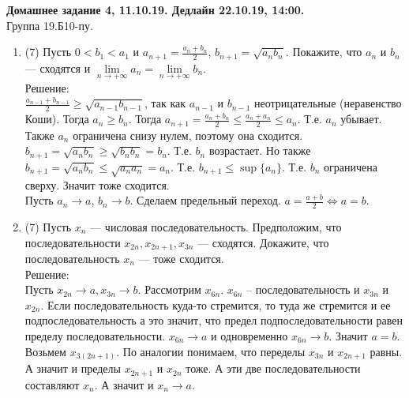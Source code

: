 \documentclass[a4paper]{article}
\begin{document}
\newcommand\HeaderDZ[5]{
\begin{center}
		\textbf{Домашнее задание #3, #2. Дедлайн #4, #5.}\\
		Группа #1.Б10-пу.\\
\end{center}
\vspace{-\baselineskip}
\bigskip
\bigskip
}



\renewcommand{\labelenumii}{\arabic{enumii})}
\renewcommand{\labelenumiii}{\roman{enumiii})}

\HeaderDZ{19}{11.10.19}{4}{22.10.19}{14:00}

\begin{enumerate}
    \item (7) Пусть $0<b_1<a_1$ и $a_{n+1} = \frac{a_n + b_n}{2}$, $b_{n+1} = \sqrt{a_nb_n}$. Покажите, что $a_n$ и $b_n$ --- сходятся и $\lim\limits_{n\to+\infty}a_n = \lim\limits_{n\to+\infty}b_n$.\\
    Решение:\\
    $\frac{a_{n-1} + b_{n-1}}{2} \ge \sqrt{a_{n-1}b_{n-1}}$, так как $a_{n-1}$ и $b_{n-1}$ неотрицательные (неравенство Коши). Тогда $a_{n} \ge b_{n}$. Тогда $a_{n+1} = \frac{a_n + b_n}{2} \le \frac{a_n + a_n}{2} \le a_n$. Т.е. $a_n$ убывает. Также $a_n$ ограничена снизу нулем, поэтому она сходится.\\
    $b_{n+1} = \sqrt{a_nb_n} \ge \sqrt{b_nb_n} = b_n$. Т.е. $b_n$ возрастает. Но также $b_{n+1} = \sqrt{a_nb_n} \le \sqrt{a_na_n} = a_n$. Т.е. $b_{n+1} \le \sup \{a_n\}$. Т.е. $b_n$ ограничена сверху. Значит тоже сходится.\\
    Пусть $a_n \rightarrow a$, $b_n \rightarrow b$. Сделаем предельный переход. $a = \frac{a+b}{2} \Leftrightarrow a = b$.  
    \item (7) Пусть $x_n$ --- числовая последовательность. Предположим, что последовательности $x_{2n}, x_{2n+1}, x_{3n}$ --- сходятся. Докажите, что последовательность $x_n$ --- тоже сходится.\\
    Решение:\\
    Пусть $x_{2n} \rightarrow a, x_{3n} \rightarrow b$. Рассмотрим $x_{6n}$. $x_{6n}$ -- последовательность и $x_{3n}$ и $x_{2n}$. Если последовательность куда-то стремится, то туда же стремится и ее подпоследовательность а это значит, что предел подпоследовательности равен пределу последовательности. $x_{6n} \rightarrow a$ и одновременно $x_{6n} \rightarrow b$. Значит $a=b$.\\
    Возьмем $x_{3(2n+1)}$. По аналогии понимаем, что переделы $x_{3n}$ и $x_{2n+1}$ равны. А значит и пределы $x_{2n+1}$ и $x_{2n}$ тоже. А эти две последовательности составляют $x_n$. А значит и $x_n \rightarrow a$.

\end{enumerate}
\end{document}
